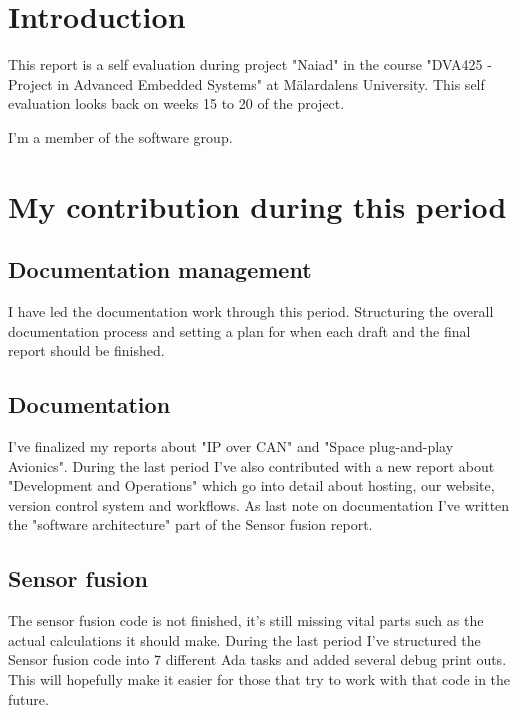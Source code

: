 \section{Introduction}
This report is a self evaluation during project "Naiad" in the course
"DVA425 - Project in Advanced Embedded Systems" at M\"{a}lardalens University.
This self evaluation looks back on weeks 15 to 20 of the project.

I'm a member of the software group.

\section{My contribution during this period}

\subsection{Documentation management}
I have led the documentation work through this period. Structuring the
overall documentation process and setting a plan for when each draft and
the final report should be finished.

\subsection{Documentation}
I've finalized my reports about "IP over CAN" and "Space plug-and-play Avionics".
During the last period I've also contributed with a new report about "Development
and Operations" which go into detail about hosting, our website, version
control system and workflows. As last note on documentation I've written
the "software architecture" part of the Sensor fusion report.

\subsection{Sensor fusion}
The sensor fusion code is not finished, it's still missing vital parts such as
the actual calculations it should make. During the last period I've structured
the Sensor fusion code into 7 different Ada tasks and added several debug print
outs. This will hopefully make it easier for those that try to work with that
code in the future.

